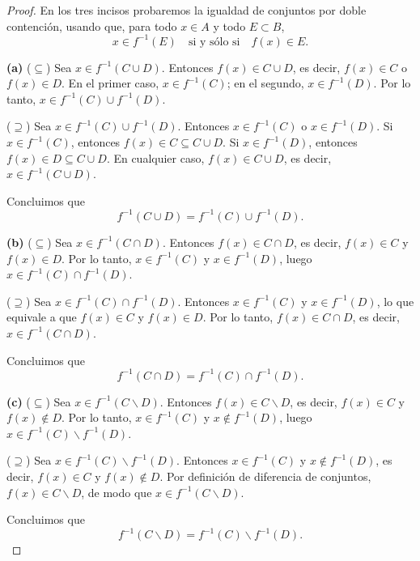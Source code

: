 \documentclass[12pt,a4paper]{article}
\begin{document}
    \begin{proof}
        En los tres incisos probaremos la igualdad de conjuntos por doble contención, usando que, para todo $x\in A$ y todo $E\subset B$,
        \begin{equation*}
            x\in f^{-1}(E)\quad\text{si y sólo si}\quad f(x)\in E.
        \end{equation*}

        \textbf{(a)} ($\subseteq$) Sea $x\in f^{-1}(C\cup D)$. Entonces $f(x)\in C\cup D$, es decir, $f(x)\in C$ o $f(x)\in D$. En el primer caso, $x\in f^{-1}(C)$; en el segundo, $x\in f^{-1}(D)$. Por lo tanto, $x\in f^{-1}(C)\cup f^{-1}(D)$.

        ($\supseteq$) Sea $x\in f^{-1}(C)\cup f^{-1}(D)$. Entonces $x\in f^{-1}(C)$ o $x\in f^{-1}(D)$. Si $x\in f^{-1}(C)$, entonces $f(x)\in C\subseteq C\cup D$. Si $x\in f^{-1}(D)$, entonces $f(x)\in D\subseteq C\cup D$. En cualquier caso, $f(x)\in C\cup D$, es decir, $x\in f^{-1}(C\cup D)$.

        Concluimos que
        \begin{equation*}
            f^{-1}(C\cup D)=f^{-1}(C)\cup f^{-1}(D).
        \end{equation*}

        \textbf{(b)} ($\subseteq$) Sea $x\in f^{-1}(C\cap D)$. Entonces $f(x)\in C\cap D$, es decir, $f(x)\in C$ y $f(x)\in D$. Por lo tanto, $x\in f^{-1}(C)$ y $x\in f^{-1}(D)$, luego $x\in f^{-1}(C)\cap f^{-1}(D)$.

        ($\supseteq$) Sea $x\in f^{-1}(C)\cap f^{-1}(D)$. Entonces $x\in f^{-1}(C)$ y $x\in f^{-1}(D)$, lo que equivale a que $f(x)\in C$ y $f(x)\in D$. Por lo tanto, $f(x)\in C\cap D$, es decir, $x\in f^{-1}(C\cap D)$.

        Concluimos que
        \begin{equation*}
            f^{-1}(C\cap D)=f^{-1}(C)\cap f^{-1}(D).
        \end{equation*}

        \textbf{(c)} ($\subseteq$) Sea $x\in f^{-1}(C\backslash D)$. Entonces $f(x)\in C\backslash D$, es decir, $f(x)\in C$ y $f(x)\notin D$. Por lo tanto, $x\in f^{-1}(C)$ y $x\notin f^{-1}(D)$, luego $x\in f^{-1}(C)\backslash f^{-1}(D)$.

        ($\supseteq$) Sea $x\in f^{-1}(C)\backslash f^{-1}(D)$. Entonces $x\in f^{-1}(C)$ y $x\notin f^{-1}(D)$, es decir, $f(x)\in C$ y $f(x)\notin D$. Por definición de diferencia de conjuntos, $f(x)\in C\backslash D$, de modo que $x\in f^{-1}(C\backslash D)$.

        Concluimos que
        \begin{equation*}
            f^{-1}(C\backslash D)=f^{-1}(C)\backslash f^{-1}(D).
        \end{equation*}
    \end{proof}
\end{document}
